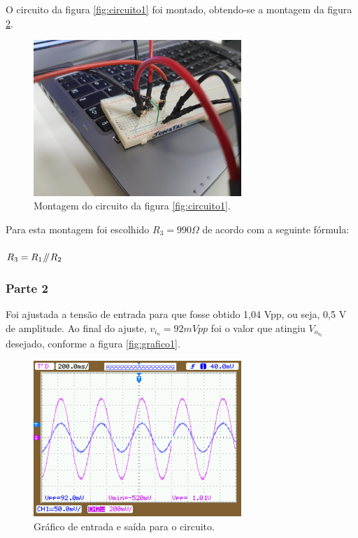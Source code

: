 \documentclass{abntex2}
\newcommand{\parallelsum}{\mathbin{\!/\mkern-5mu/\!}}
\begin{document}
O circuito da figura \ref{fig:circuito1} foi montado, obtendo-se a montagem da figura \ref{fig:montagem1}.

\begin{figure}[h]
  \centering
  \includegraphics[width = 0.7\textwidth]{montagem1.jpg}
  \caption{Montagem do circuito da figura \ref{fig:circuito1}.}
  \label{fig:montagem1}
\end{figure}
Para esta montagem foi escolhido $R_3 = 990\Omega$ de acordo com a seguinte fórmula: \\\\$R_3 = R_1 \parallelsum R_2$

\subsubsection{Parte 2}

Foi ajustada a tensão de entrada para que fosse obtido 1,04 Vpp, ou seja, 0,5 V de amplitude. Ao final do ajuste, $v_i_n = 92 mVpp$ foi o valor que atingiu $V_o_u_t$ desejado, conforme a figura \ref{fig:grafico1}.
\begin{figure}[h]
  \centering
  \includegraphics[width = 0.7\textwidth]{NewFile13.png}
  \caption{Gráfico de entrada e saída para o circuito.}
  \label{fig:montagem1}
\end{figure}
\end{document}

